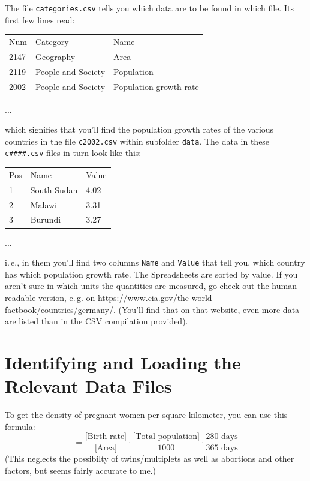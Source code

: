 \documentclass[
	english,
	fontsize=10pt,
	parskip=half,
	titlepage=true,
	DIV=12
]{scrartcl}
\newcommand*{\ie}{i.\,e.\xspace}
\newcommand*{\eg}{e.\,g.\xspace}
\begin{document}
The file \texttt{categories.csv} tells you which data are to be found in which file. Its first few lines read:
\begin{center}
\selectfont
\begin{tabular}{lll}
Num & Category & Name\\
2147 & Geography & Area\\
2119 & People and Society & Population\\
2002 & People and Society & Population growth rate\\
\end{tabular}

...
\end{center}
which signifies that you'll find the population growth rates of the various countries in the file \texttt{c2002.csv} within subfolder \texttt{data}. The data in these \texttt{c\#\#\#\#.csv} files in turn look like this:
\begin{center}
\selectfont
\begin{tabular}{lll}
Pos & Name & Value\\
1 & South Sudan & 4.02\\
2 & Malawi & 3.31\\
3 & Burundi & 3.27\\
\end{tabular}

...
\end{center}
\ie, in them you'll find two columns \texttt{Name} and \texttt{Value} that tell you, which country has which population growth rate. The Spreadsheets are sorted by value. If you aren't sure in which units the quantities are measured, go check out the human-readable version, \eg on \url{https://www.cia.gov/the-world-factbook/countries/germany/}. (You'll find that on that website, even more data are listed than in the CSV compilation provided).

\section{Identifying and Loading the Relevant Data Files}
To get the density of pregnant women per square kilometer, you can use this formula:
\begin{equation*}
	[\text{pregnancy-density}]
=
	\frac
		{\text{[Birth rate]}}
		{\text{[Area]}}
	\cdot
	\frac
		{\text{[Total population]}}
		{1000}
	\cdot
	\frac
		{280 \text{ days}}
		{365 \text{ days}}
\end{equation*}
(This neglects the possibilty of twins/multiplets as well as abortions and other factors, but seems fairly accurate to me.)
\end{document}
